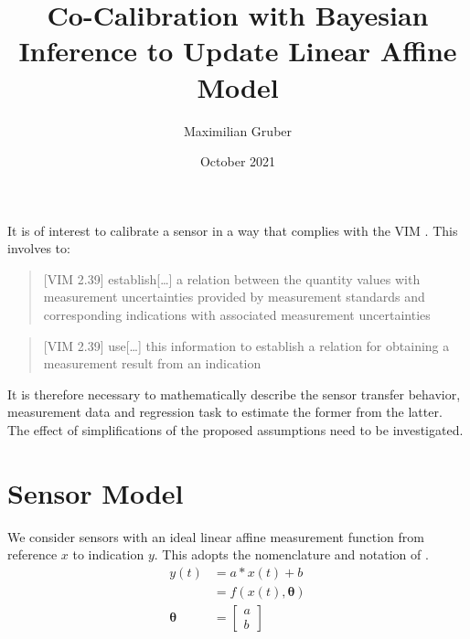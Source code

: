 \documentclass[10pt]{article}
\title{Co-Calibration with Bayesian Inference to Update Linear Affine Model}
\author{Maximilian Gruber}    %
\date{October 2021}
\renewcommand{\vec}[1]{\boldsymbol{#1}}
\begin{document}
    \maketitle
    
    It is of interest to calibrate a sensor in a way that complies with the VIM \cite{bipm_2012}. 
    This involves to:
    
    \begin{quote}[VIM 2.39]
        establish[\dots] a relation between the quantity values with measurement uncertainties provided by measurement standards and corresponding indications with associated measurement uncertainties
    \end{quote}
    
    \begin{quote}[VIM 2.39]
        use[\dots] this information to establish a relation for obtaining a measurement result from an indication
    \end{quote}
    
    It is therefore necessary to mathematically describe the sensor transfer behavior, measurement data and regression task to estimate the former from the latter.
    The effect of simplifications of the proposed assumptions need to be investigated.
    
    
    \section{Sensor Model}
    We consider sensors with an ideal linear affine measurement function from reference $x$ to indication $y$.
    This adopts the nomenclature and notation of \cite{bipm_2008,bipm_2012}.
    \begin{align}
        y(t) &= a*x(t) + b \nonumber \\
           &= f(x(t), \vec{\theta}) \\
        \vec{\theta} &= \begin{bmatrix} a \\ b \end{bmatrix}
    \end{align}
    
    
\end{document}
